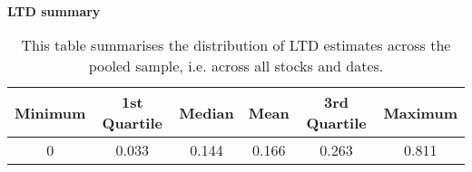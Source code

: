 \begin{table}[h]
\caption{\\ \large{\textbf{LTD summary}}}
\captionsetup{font = footnotesize, justification = justified, width = \linewidth}
\caption*{This table summarises the distribution of LTD estimates
                        across the pooled sample, i.e. across all stocks and dates.}
\centering
\label{tab:ltd_summary_centered}
\begin{tabular}[t]{rrrrrr}
\toprule
\multicolumn{1}{c}{\textbf{Minimum}} & \multicolumn{1}{c}{\textbf{1st Quartile}} & \multicolumn{1}{c}{\textbf{Median}} & \multicolumn{1}{c}{\textbf{Mean}} & \multicolumn{1}{c}{\textbf{3rd Quartile}} & \multicolumn{1}{c}{\textbf{Maximum}}\\
\midrule
\multicolumn{1}{c}{0} & \multicolumn{1}{c}{0.033} & \multicolumn{1}{c}{0.144} & \multicolumn{1}{c}{0.166} & \multicolumn{1}{c}{0.263} & \multicolumn{1}{c}{0.811}\\
\bottomrule
\end{tabular}
\end{table}
